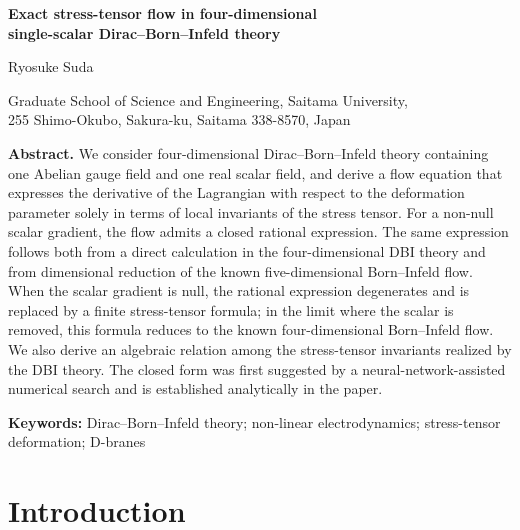 \documentclass[a4paper,11pt]{article}
\numberwithin{equation}{section}
\begin{document}
\hypersetup{pageanchor=false}
\begin{titlepage}
\thispagestyle{empty}
\begin{center}
\vspace*{22mm}
{\Large\bfseries Exact stress-tensor flow in four-dimensional\\[2mm]
single-scalar Dirac--Born--Infeld theory\par}
\vspace{16mm}
{\large Ryosuke Suda\footnotemark\par}
\vspace{4mm}
{\normalsize
Graduate School of Science and Engineering, Saitama University,\\
255 Shimo-Okubo, Sakura-ku, Saitama 338-8570, Japan\par}
\vspace{18mm}
\end{center}

\noindent\textbf{Abstract.}
We consider four-dimensional Dirac--Born--Infeld theory containing one Abelian gauge field and one real scalar field, and derive a flow equation that expresses the derivative of the Lagrangian with respect to the deformation parameter solely in terms of local invariants of the stress tensor. For a non-null scalar gradient, the flow admits a closed rational expression. The same expression follows both from a direct calculation in the four-dimensional DBI theory and from dimensional reduction of the known five-dimensional Born--Infeld flow. When the scalar gradient is null, the rational expression degenerates and is replaced by a finite stress-tensor formula; in the limit where the scalar is removed, this formula reduces to the known four-dimensional Born--Infeld flow. We also derive an algebraic relation among the stress-tensor invariants realized by the DBI theory. The closed form was first suggested by a neural-network-assisted numerical search and is established analytically in the paper.

\vspace{8mm}
\noindent\textbf{Keywords:} Dirac--Born--Infeld theory; non-linear electrodynamics; stress-tensor deformation; D-branes

\vfill
{}
\end{titlepage}

\hypersetup{pageanchor=true}
\setcounter{page}{1}

\section{Introduction}
\end{document}
